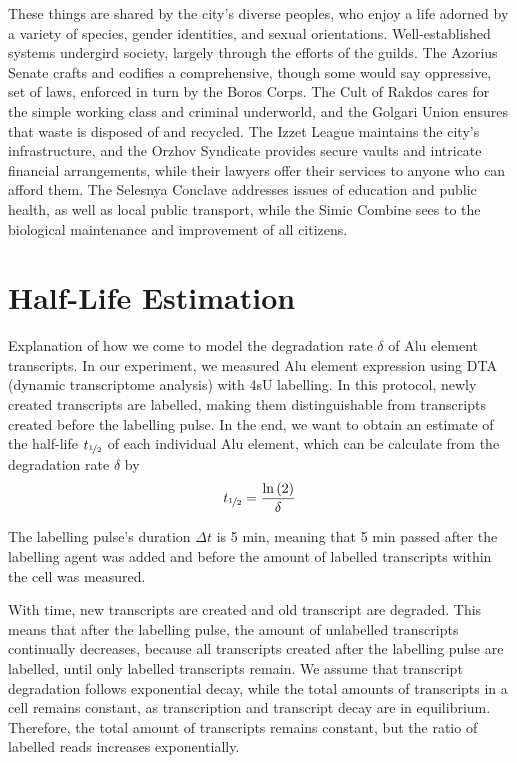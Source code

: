 These things are shared by the city's diverse peoples, who enjoy a life adorned
by a variety of  species, gender identities, and sexual orientations.
Well-established systems undergird society, largely through the efforts of the
guilds. The Azorius Senate crafts and codifies a comprehensive, though some
would say oppressive, set of laws, enforced in turn by the Boros Corps. The Cult
of Rakdos cares for the simple working class and criminal underworld, and the
Golgari Union ensures that waste is disposed of and recycled. The Izzet League
maintains the city's infrastructure, and the Orzhov Syndicate provides secure
vaults and intricate financial arrangements, while their lawyers offer their
services to anyone who can afford them. The Selesnya Conclave addresses issues
of education and public health, as well as local public transport, while the
Simic Combine sees to the biological maintenance and improvement of all
citizens.

\section{Half-Life Estimation}

Explanation of how we come to model the degradation rate
$\delta$ of Alu
element transcripts. In our experiment, we measured Alu element expression using
DTA (dynamic transcriptome analysis) with 4sU labelling. In this protocol, newly
created transcripts are labelled, making them distinguishable from transcripts
created before the labelling pulse. In the end, we want to obtain an estimate of
the half-life $t_{\nicefrac{1}{2}}$ of each individual Alu element, which can be
calculate from the degradation rate
$\delta$ by
\begin{equation*}
t_{\nicefrac{1}{2}}=\frac{\ln\left(2\right)}{\delta}
\end{equation*}

\noindent The labelling pulse's duration $\Delta t$ is 5 min, meaning that 5 min
passed after the labelling agent was added and before the amount of labelled
transcripts within the cell was measured.

With time, new transcripts are created and old transcript are degraded. This
means that after the labelling pulse, the amount of unlabelled transcripts
continually decreases, because all transcripts created after the labelling pulse
are labelled, until only labelled transcripts remain. We assume that transcript
degradation follows exponential decay, while the total amounts of transcripts
in a cell remains constant, as transcription and transcript decay are in
equilibrium. Therefore, the total amount of transcripts remains constant, but
the ratio of labelled reads increases exponentially.

